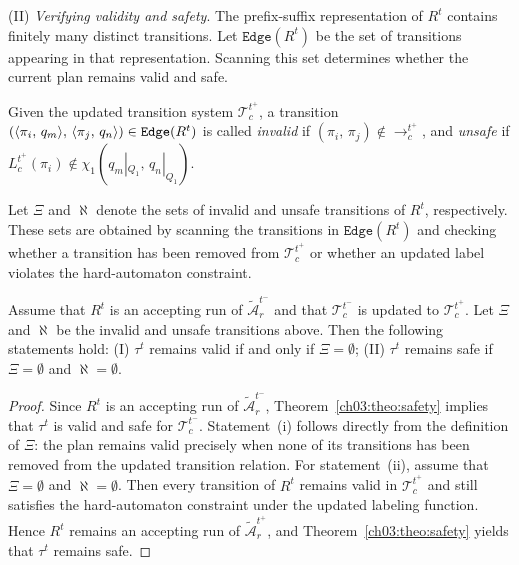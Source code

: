 (II) \emph{Verifying validity and safety}.
The prefix-suffix representation of $R^t$ contains finitely many distinct
transitions. Let $\texttt{Edge}(R^t)$ be the set of transitions appearing in
that representation. Scanning this set determines whether the current plan
remains valid and safe.

\begin{definition}\label{ch03:def:vsTS}
Given the updated transition system $\mathcal{T}_c^{t^+}$, a transition
$(\langle \pi_i,\, q_m \rangle,\,
\langle \pi_j,\, q_n \rangle) \in \textup{\texttt{Edge}}(R^t)$ is called
\emph{invalid} if $(\pi_i,\, \pi_j) \notin \longrightarrow_c^{t^+}$, and
\emph{unsafe} if
$L_c^{t^+}(\pi_i) \notin \chi_1(q_m|_{Q_1},\, q_n|_{Q_1})$.
\end{definition}

Let $\Xi$ and $\aleph$ denote the sets of invalid and unsafe transitions of
$R^t$, respectively. These sets are obtained by scanning the transitions in
$\texttt{Edge}(R^t)$ and checking whether a transition has been removed from
$\mathcal{T}_c^{t^+}$ or whether an updated label violates the hard-automaton
constraint.

\begin{theorem}\label{ch03:theo:validity}
Assume that $R^t$ is an accepting run of $\tilde{\mathcal{A}}_r^{t^-}$ and that
$\mathcal{T}_c^{t^-}$ is updated to $\mathcal{T}_c^{t^+}$. Let $\Xi$ and
$\aleph$ be the invalid and unsafe transitions above. Then the
following statements hold:
(I) $\tau^t$ remains valid if and only if $\Xi = \emptyset$;
(II) $\tau^t$ remains safe if $\Xi = \emptyset$ and $\aleph = \emptyset$.
\end{theorem}

\begin{proof}
Since $R^t$ is an accepting run of $\tilde{\mathcal{A}}_r^{t^-}$,
Theorem~\ref{ch03:theo:safety} implies that $\tau^t$ is valid and safe for
$\mathcal{T}_c^{t^-}$. Statement~(i) follows directly from the definition of
$\Xi$: the plan remains valid precisely when none of its transitions has been
removed from the updated transition relation.
For statement~(ii), assume that $\Xi = \emptyset$ and $\aleph = \emptyset$.
Then every transition of $R^t$ remains valid in $\mathcal{T}_c^{t^+}$ and
still satisfies the hard-automaton constraint under the updated labeling
function. Hence $R^t$ remains an accepting run of
$\tilde{\mathcal{A}}_r^{t^+}$, and Theorem~\ref{ch03:theo:safety} yields that
$\tau^t$ remains safe.
\end{proof}

